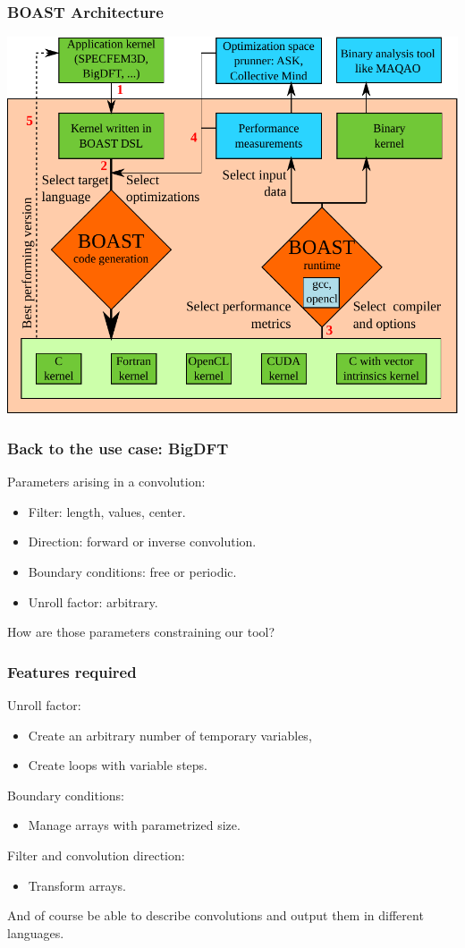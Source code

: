 \documentclass{beamer}
\begin{document}
\begin{frame}
\frametitle{BOAST Architecture}
 \begin{center}
   \includegraphics[scale=0.5]{BOAST_Workflow}
 \end{center}
\end{frame}

\begin{frame}
  \frametitle{Back to the use case: BigDFT}
Parameters arising in a convolution:
\begin{itemize}
\item Filter: length, values, center.
\item Direction: forward or inverse convolution.
\item Boundary conditions: free or periodic.
\item Unroll factor: arbitrary.
\end{itemize}
How are those parameters constraining our tool?
\end{frame}

\begin{frame}
\frametitle{Features required}
Unroll factor:
\begin{itemize}
\item Create an arbitrary number of temporary variables,
\item Create loops with variable steps.
\end{itemize}
Boundary conditions:
\begin{itemize}
\item Manage arrays with parametrized size.
\end{itemize}
Filter and convolution direction:
\begin{itemize}
\item Transform arrays.
\end{itemize}
And of course be able to describe convolutions and output them in different languages.
\end{frame}
\end{document}
